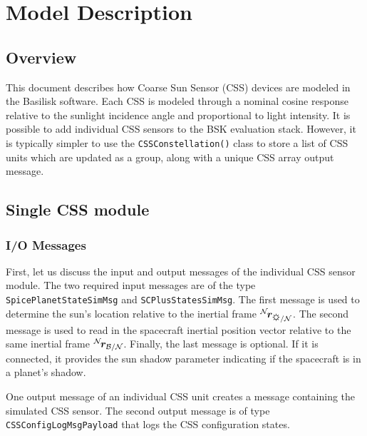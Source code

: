 


\section{Model Description}

\subsection{Overview}
This document describes how Coarse Sun Sensor (CSS) devices are modeled in the Basilisk software.  Each CSS is modeled through a nominal cosine response relative to the sunlight incidence angle and proportional to light intensity.  It is possible to add individual CSS sensors to the BSK evaluation stack.  However, it is typically simpler to use the {\tt CSSConstellation()} class to store a list of CSS units which are updated as a group, along with a unique CSS array output message.

\subsection{Single CSS module}
\subsubsection{I/O Messages}
First, let us discuss the input and output messages of the individual CSS sensor module.  The two required input messages are of the type {\tt SpicePlanetStateSimMsg} and {\tt SCPlusStatesSimMsg}.  The first message is used to determine the sun's location relative to the inertial frame $\leftexp{N}{\bm r}_{\sun/\mathcal{N}}$.  The second message is used to read in the spacecraft inertial position vector relative to the same inertial frame $\leftexp{N}{\bm r}_{\cal B/N}$.  Finally, the last message is optional.  If it is connected, it provides the sun shadow parameter indicating if the spacecraft is in a planet's shadow.  

One output message of an individual CSS unit creates a message containing the simulated CSS sensor.  The second output message is of type {\tt CSSConfigLogMsgPayload} that logs the CSS configuration states.  



